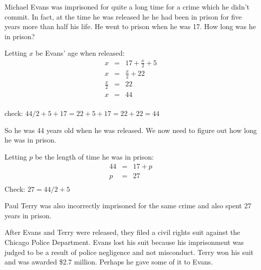 \documentclass[fleqn,addpoints]{exam}
\begin{document}
\begin{questions}
\begin{parts}
\begin{part}
\begin{solution}
\end{solution}

\end{part}

\begin{part}

Michael Evans was imprisoned for quite a long time for a crime which he didn't commit.  In fact, at the
time he was released he he had been in prison for five years more than half his life. He went to prison when he was
17.  How long was he in prison? 

\begin{solution}
  Letting $x$ be Evans' age when released:
  \begin{eqnarray*}
    x & = & 17 + \frac{x}{2} + 5 \\
    x & = & \frac{x}{2} + 22 \\
    \frac{x}{2} & = & 22 \\
    x & = & 44 \\
  \end{eqnarray*}

check: \( 44/2 + 5 + 17 = 22 + 5 + 17 = 22 + 22 = 44 \)

  So he was 44 years old when he was released.  We now need to figure out how long he was in prison. 

  Letting $p$ be the length of time he was in prison:
  \begin{eqnarray*}
    44 & = & 17 + p \\
    p & = & 27 \\
  \end{eqnarray*}
Check: \( 27 = 44 / 2 + 5  \)

\vspace{.1 in}

Paul Terry was also incorrectly imprisoned for the same crime and also spent 27 years in prison.  

After Evans and Terry were
released, they filed a civil rights suit against the Chicago Police Department.  Evans lost his suit because his
imprisonment was judged to be a result of police negligence and not misconduct.  Terry won his suit and was awarded
\$2.7 million.  Perhaps he gave some of it to Evans.

\end{solution}

\end{part}

\end{parts}

\ifprintanswers
\else
\pagebreak
\fi


\end{questions}
\end{document}
